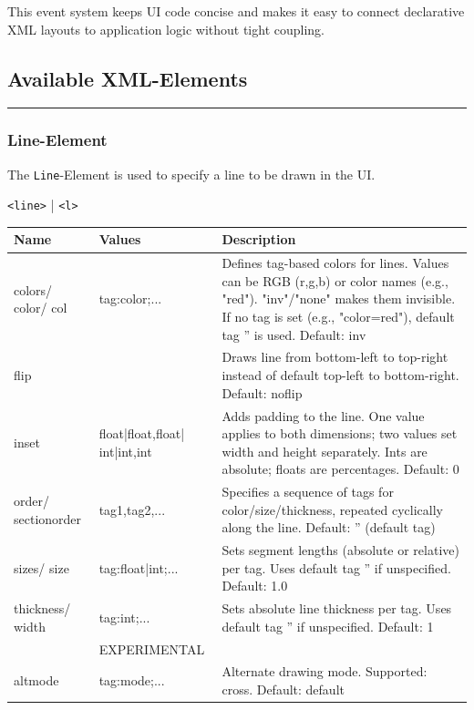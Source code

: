 \documentclass[a4paper,11pt]{article}
\begin{document}
This event system keeps UI code concise and makes it easy to connect declarative XML layouts to application logic without tight coupling.


\newpage
\subsection*{Available XML-Elements}
\vspace{-1.2em}
\rule{\linewidth}{0.4pt}


\hypertarget{line}{}
\subsubsection*{Line-Element}
The \texttt{Line}-Element is used to specify a line to be drawn in the UI.
\begin{center}
    \texttt{<line>} | \texttt{<l>}
\end{center}

\renewcommand{\arraystretch}{1.3}
\begin{tcolorbox}[colback=white, colframe=black!75, title=Arguments]
\begin{tabularx}{\linewidth}{p{45pt}|p{90pt}|X}
\textbf{Name} & \textbf{Values} & \textbf{Description}\\
\hline
colors/ color/ col & tag:color;... & Defines tag-based colors for lines. Values can be RGB (r,g,b) or color names (e.g., "red"). "inv"/"none" makes them invisible. If no tag is set (e.g., "color=red"), default tag '' is used. Default: inv\\
\rowcolor[HTML]{E8E8E8}
flip & & Draws line from bottom-left to top-right instead of default top-left to bottom-right. Default: noflip\\
inset & float|float,float| int|int,int & Adds padding to the line. One value applies to both dimensions; two values set width and height separately. Ints are absolute; floats are percentages. Default: 0\\
\rowcolor[HTML]{E8E8E8}
order/ sectionorder & tag1,tag2,... & Specifies a sequence of tags for color/size/thickness, repeated cyclically along the line. Default: '' (default tag)\\
sizes/ size & tag:float|int;... & Sets segment lengths (absolute or relative) per tag. Uses default tag '' if unspecified. Default: 1.0\\
\rowcolor[HTML]{E8E8E8}
thickness/ width & tag:int;... & Sets absolute line thickness per tag. Uses default tag '' if unspecified. Default: 1\\
& EXPERIMENTAL & \\
\rowcolor[HTML]{E8E8E8}
altmode & tag:mode;... & Alternate drawing mode. Supported: cross. Default: default
\end{tabularx}
\end{tcolorbox}
\end{document}
